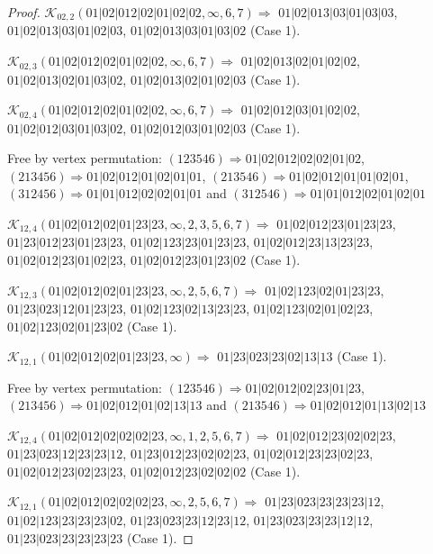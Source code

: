 \documentclass[12pt]{article}
\theoremstyle{plain}
\theoremstyle{definition}
\theoremstyle{remark}
\newcommand{\fancy}[1]{\mathcal{#1}}
\def\K{\fancy{K}}
\begin{document}
\begin{proof}
	
	
	\bigskip
	
	$\K_{02,2}(01|02|012|02|01|02|02,\infty,6, 7)\Rightarrow $ $01|02|013|03|01|03|03$, $01|02|013|03|01|02|03$, $01|02|013|03|01|03|02$ (Case 1).
	
	$\K_{02,3}(01|02|012|02|01|02|02,\infty,6, 7)\Rightarrow $ $01|02|013|02|01|02|02$, $01|02|013|02|01|03|02$, $01|02|013|02|01|02|03$ (Case 1).
	
	$\K_{02,4}(01|02|012|02|01|02|02,\infty,6, 7)\Rightarrow $ $01|02|012|03|01|02|02$, $01|02|012|03|01|03|02$, $01|02|012|03|01|02|03$ (Case 1).
	
	
	
	Free by vertex permutation: $(1 2 3 5 4 6)\Rightarrow 01|02|012|02|02|01|02$, $(2 1 3 4 5 6)\Rightarrow 01|02|012|01|02|01|01$, $(2 1 3 5 4 6)\Rightarrow 01|02|012|01|01|02|01$, $(3 1 2 4 5 6)\Rightarrow 01|01|012|02|02|01|01$ and $(3 1 2 5 4 6)\Rightarrow 01|01|012|02|01|02|01$
	
	
	
	\bigskip
	
	$\K_{12,4}(01|02|012|02|01|23|23,\infty,2, 3, 5, 6, 7)\Rightarrow $ $01|02|012|23|01|23|23$, $01|23|012|23|01|23|23$, $01|02|123|23|01|23|23$, $01|02|012|23|13|23|23$, $01|02|012|23|01|02|23$, $01|02|012|23|01|23|02$ (Case 1).
	
	$\K_{12,3}(01|02|012|02|01|23|23,\infty,2, 5, 6, 7)\Rightarrow $ $01|02|123|02|01|23|23$, $01|23|023|12|01|23|23$, $01|02|123|02|13|23|23$, $01|02|123|02|01|02|23$, $01|02|123|02|01|23|02$ (Case 1).
	
	$\K_{12,1}(01|02|012|02|01|23|23,\infty)\Rightarrow $ $01|23|023|23|02|13|13$ (Case 1).
	
	
	
	Free by vertex permutation: $(1 2 3 5 4 6)\Rightarrow 01|02|012|02|23|01|23$, $(2 1 3 4 5 6)\Rightarrow 01|02|012|01|02|13|13$ and $(2 1 3 5 4 6)\Rightarrow 01|02|012|01|13|02|13$
	
	
	
	\bigskip
	
	$\K_{12,4}(01|02|012|02|02|02|23,\infty,1, 2, 5, 6, 7)\Rightarrow $ $01|02|012|23|02|02|23$, $01|23|023|12|23|23|12$, $01|23|012|23|02|02|23$, $01|02|012|23|23|02|23$, $01|02|012|23|02|23|23$, $01|02|012|23|02|02|02$ (Case 1).
	
	$\K_{12,1}(01|02|012|02|02|02|23,\infty,2, 5, 6, 7)\Rightarrow $ $01|23|023|23|23|23|12$, $01|02|123|23|23|23|02$, $01|23|023|23|12|23|12$, $01|23|023|23|23|12|12$, $01|23|023|23|23|23|23$ (Case 1).
	

\end{proof}
\end{document}
